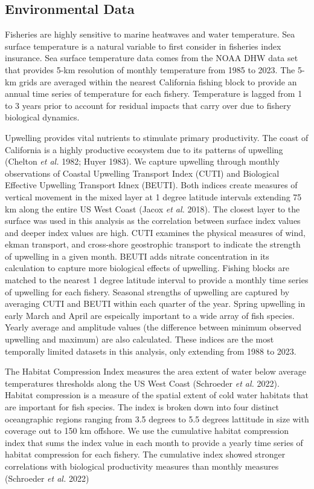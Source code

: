 \documentclass[
  letterpaper,
  DIV=11,
  numbers=noendperiod]{scrartcl}
\begin{document}
\hypertarget{environmental-data}{%
\subsection{Environmental Data}\label{environmental-data}}

Fisheries are highly sensitive to marine heatwaves and water
temperature. Sea surface temperature is a natural variable to first
consider in fisheries index insurance. Sea surface temperature data
comes from the NOAA DHW data set that provides 5-km resolution of
monthly temperature from 1985 to 2023. The 5-km grids are averaged
within the nearest California fishing block to provide an annual time
series of temperature for each fishery. Temperature is lagged from 1 to
3 years prior to account for residual impacts that carry over due to
fishery biological dynamics.

Upwelling provides vital nutrients to stimulate primary productivity.
The coast of California is a highly productive ecosystem due to its
patterns of upwelling (Chelton \emph{et al.} 1982; Huyer 1983). We
capture upwelling through monthly observations of Coastal Upwelling
Transport Index (CUTI) and Biological Effective Upwelling Transport
Idnex (BEUTI). Both indices create measures of vertical movement in the
mixed layer at 1 degree latitude intervals extending 75 km along the
entire US West Coast (Jacox \emph{et al.} 2018). The closest layer to
the surface was used in this analysis as the correlation between surface
index values and deeper index values are high. CUTI examines the
physical measures of wind, ekman transport, and cross-shore geostrophic
transport to indicate the strength of upwelling in a given month. BEUTI
adds nitrate concentration in its calculation to capture more biological
effects of upwelling. Fishing blocks are matched to the nearest 1 degree
latitude interval to provide a monthly time series of upwelling for each
fishery. Seasonal strengths of upwelling are captured by averaging CUTI
and BEUTI within each quarter of the year. Spring upwelling in early
March and April are espeically important to a wide array of fish
species. Yearly average and amplitude values (the difference between
minimum observed upwelling and maximum) are also calculated. These
indices are the most temporally limited datasets in this analysis, only
extending from 1988 to 2023.

The Habitat Compression Index measures the area extent of water below
average temperatures thresholds along the US West Coast (Schroeder
\emph{et al.} 2022). Habitat compression is a measure of the spatial
extent of cold water habitats that are important for fish species. The
index is broken down into four distinct oceangraphic regions ranging
from 3.5 degrees to 5.5 degrees lattitude in size with coverage out to
150 km offshore. We use the cumulative habitat compression index that
sums the index value in each month to provide a yearly time series of
habitat compression for each fishery. The cumulative index showed
stronger correlations with biological productivity measures than monthly
measures (Schroeder \emph{et al.} 2022)
\end{document}
